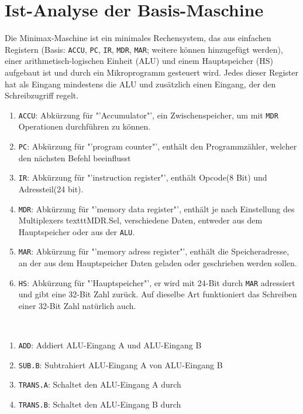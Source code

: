 \documentclass[12pt,titlepage]{article}
\begin{document}
\newpage

\section{Ist-Analyse der Basis-Maschine}

Die Minimax-Maschine ist ein minimales Rechensystem, das aus einfachen Registern (Basis: \texttt{ACCU}, \texttt{PC}, \texttt{IR}, \texttt{MDR}, \texttt{MAR};
weitere k{\"o}nnen hinzugef{\"u}gt werden), einer arithmetisch-logischen Einheit (ALU) und einem Hauptspeicher (HS) aufgebaut
ist und durch ein Mikroprogramm gesteuert wird. Jedes dieser Register hat als Eingang mindestens die ALU und zusätzlich einen Eingang, der den Schreibzugriff regelt.\\
\begin{enumerate}
\item \texttt{ACCU}: Abk{\"u}rzung f{\"u}r "'Accumulator"', ein Zwischenspeicher, um mit \texttt{MDR} Operationen durchführen zu k{\"o}nnen.
\item \texttt{PC}: Abk{\"u}rzung f{\"u}r "'program counter"', enthält den Programmzähler, welcher den nächsten Befehl beeinflusst
\item \texttt{IR}: Abk{\"u}rzung f{\"u}r "'instruction register"', enthält Opcode(8 Bit) und Adressteil(24 bit).
\item \texttt{MDR}: Abk{\"u}rzung f{\"u}r "'memory data register"', enthält je nach Einstellung des Multiplexers texttt{MDR.Sel}, verschiedene Daten, entweder aus dem Hauptspeicher oder aus der \texttt{ALU}.
\item \texttt{MAR}: Abk{\"u}rzung f{\"u}r "'memory adress register"', enth{\"a}lt die Speicheradresse, an der aus dem Hauptspeicher Daten geladen oder geschrieben werden sollen.
\item \texttt{HS}: Abk{\"u}rzung f{\"u}r "'Hauptspeicher"', er wird mit 24-Bit durch \texttt{MAR} adressiert und gibt eine 32-Bit Zahl zur{\"u}ck. Auf dieselbe Art funktioniert das Schreiben einer 32-Bit Zahl nat{\"u}rlich auch.
\end{enumerate}

\leavevmode \\

\begin{enumerate}
\item \texttt{ADD}: Addiert ALU-Eingang A und ALU-Eingang B
\item \texttt{SUB.B}: Subtrahiert ALU-Eingang A von ALU-Eingang B
\item \texttt{TRANS.A}: Schaltet den ALU-Eingang A durch
\item \texttt{TRANS.B}: Schaltet den ALU-Eingang B durch
\end{enumerate}
\end{document}
